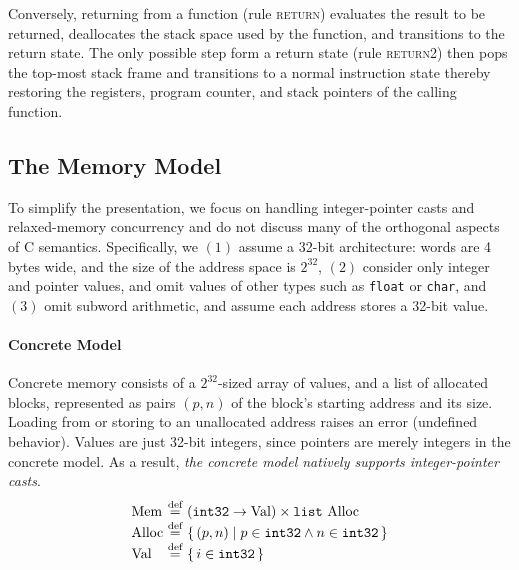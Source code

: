 Conversely, returning from a function (rule \textsc{return}) evaluates the result to be returned,
deallocates the stack space used by the function, and transitions to the return state.  The only
possible step form a return state (rule \textsc{return2}) then pops the top-most stack frame and
transitions to a normal instruction state thereby restoring the registers, program counter, and
stack pointers of the calling function.



\subsection{The Memory Model}
\label{sec:background:memory}

To simplify the presentation, we focus on handling integer-pointer casts and relaxed-memory
concurrency and do not discuss many of the orthogonal aspects of C semantics.  Specifically, we
$(1)$ assume a 32-bit architecture: words are 4 bytes wide, and the size of the address space is
$2^{32}$, $(2)$ consider only integer and pointer values, and omit values of other types such as
\texttt{float} or \texttt{char}, and $(3)$ omit subword arithmetic, and assume each address stores a
32-bit value.  


\paragraph{Concrete Model}

Concrete memory consists of a $2^{32}$-sized array of values, and a
list of allocated blocks, 
represented as pairs $(p,n)$ of the block's starting address and its size.
Loading from or storing to an unallocated address raises
an error (\ie undefined behavior).  Values are just 32-bit integers,
since pointers are merely integers in the concrete model.
As a result, \emph{the concrete model natively supports integer-pointer casts}.
\[
\begin{array}{@{}l@{~}c@{~}l@{}}
\mathrm{Mem} &\defeq& (\inttype \to \mathrm{Val}) \times \mathtt{list}\ \mathrm{Alloc} \\
\mathrm{Alloc} &\defeq& \setof{(p,n) \suchthat p \in \inttype \land n \in \inttype} \\
\mathrm{Val} &\defeq& \setof{i\in\inttype}
\end{array}
\]

